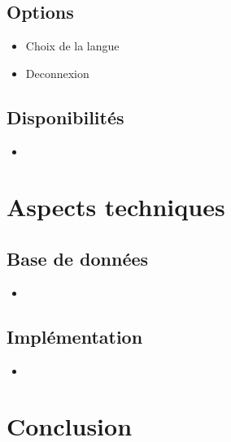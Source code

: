 \documentclass{beamer}
\begin{document}
\subsection{Options}
\begin{frame}
\begin{itemize}
    \item{Choix de la langue}
    \item{Deconnexion}
    
\end{itemize}
\end{frame}

\subsection{Disponibilités}
\begin{frame}
  \begin{itemize}
      \item{}
  \end{itemize}
\end{frame}


\section{Aspects techniques}

\subsection{Base de données}

\begin{frame}
    \begin{itemize}
        \item{}
    \end{itemize}  
\end{frame}

\subsection{Implémentation}
\begin{frame}
  \begin{itemize}
      \item{}
  \end{itemize}
\end{frame}

\section{Conclusion}
\end{document}
